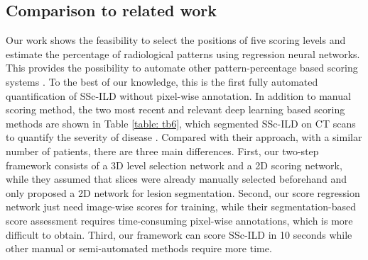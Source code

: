 \subsection{Comparison to related work}
Our work shows the feasibility to select the positions of five scoring levels and estimate the percentage of radiological patterns using regression neural networks. This provides the possibility to automate other pattern-percentage based scoring systems \cite{Assayag2012, Goldin2008, Pandey2010}. To the best of our knowledge, this is the first fully automated quantification of SSc-ILD without pixel-wise annotation. In addition to manual scoring method, the two most recent and relevant deep learning based scoring methods are shown in Table \ref{table: tb6}, which segmented SSc-ILD on CT scans to quantify the severity of disease \cite{Chassagnon2020, su2023computed}. Compared with their approach, with a similar number of patients, there are three main differences. First, our two-step framework consists of a 3D level selection network and a 2D scoring network, while they assumed that slices were already manually selected beforehand and only proposed a 2D network for lesion segmentation. Second, our score regression network just need image-wise scores for training, while their segmentation-based score assessment requires time-consuming pixel-wise annotations, which is more difficult to obtain. Third, our framework can score SSc-ILD in 10 seconds while other manual or semi-automated methods require more time.

